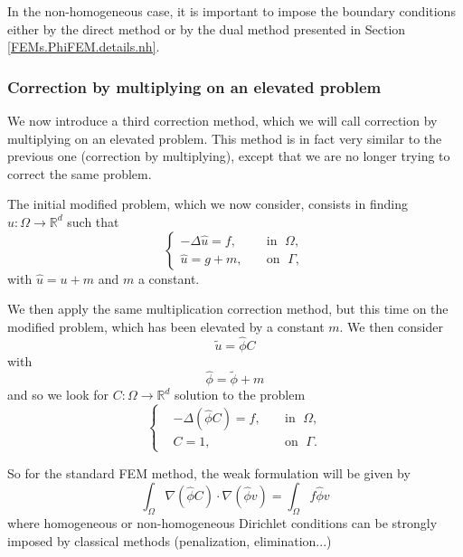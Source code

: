 In the non-homogeneous case, it is important to impose the boundary conditions either by the direct method or by the dual method presented in Section \ref{FEMs.PhiFEM.details.nh}.

\subsubsection{Correction by multiplying on an elevated problem} \label{Corr.method.mult_reh}

We now introduce a third correction method, which we will call correction by multiplying on an elevated problem. This method is in fact very similar to the previous one (correction by multiplying), except that we are no longer trying to correct the same problem.

The initial modified problem, which we now consider, consists in finding $u : \Omega \rightarrow \mathbb{R}^d$ such that
\begin{equation*}
	\left\{
	\begin{aligned}
		-\Delta \hat{u} = f, \; &&\text{in } \; \Omega, \\
		\hat{u}=g+m, \; &&\text{on } \; \Gamma,
	\end{aligned}
	\right. %
\end{equation*}
with $\hat{u}=u+m$ and $m$ a constant.

We then apply the same multiplication correction method, but this time on the modified problem, which has been elevated by a constant $m$. We then consider
\begin{equation*}
	\tilde{u}=\hat{\phi}C
\end{equation*}
with 
\begin{equation*}
	\hat{\phi}=\tilde{\phi}+m
\end{equation*}
and so we look for $C: \Omega \rightarrow \mathbb{R}^d$ solution to the problem
\begin{equation*}
	\label{eq.corr.pbc_mult_reh}
	\left\{\begin{aligned}
		&-\Delta (\hat{\phi}C)=f, \; &&\text{in } \; \Omega, \\
		&C=1, \; &&\text{on } \; \Gamma.
	\end{aligned}\right. %
\end{equation*}

So for the standard FEM method, the weak formulation will be given by
\begin{equation*}
	\int_\Omega \nabla (\hat{\phi}C)\cdot\nabla (\hat{\phi}v)=\int_\Omega f\hat{\phi}v
\end{equation*}
where homogeneous or non-homogeneous Dirichlet conditions can be strongly imposed by classical methods (penalization, elimination...)

